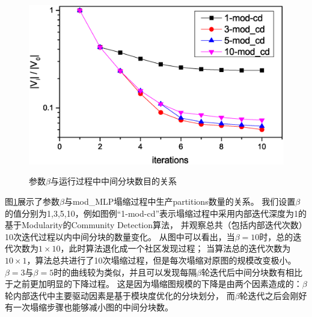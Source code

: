 \documentclass[master]{njuthesis}
\begin{document}
\begin{figure}[h]
  \centering
  \includegraphics[width= 1\textwidth]{figure/conv_time.eps}\\
  \caption{参数$\beta$与运行过程中中间分块数目的关系}
   \label{fig:conv_time}
\end{figure}

图\ref{fig:conv_time}展示了参数$\beta$与mod\string_MLP塌缩过程中生产partitions数量的关系。
我们设置$\beta$的值分别为1,3,5,10，例如图例“1-mod-cd”表示塌缩过程中采用内部迭代深度为1的基于Modularity的Community Detection算法，
并观察总共（包括内部迭代次数）10次迭代过程以内中间分块的数量变化。
从图中可以看出，当$\beta=10$时，总的迭代次数为$1\times 10$，此时算法退化成一个社区发现过程；
当算法总的迭代次数为$10\times 1$，算法总共进行了10次塌缩过程，但是每次塌缩对原图的规模改变极小。
$\beta=3$与$\beta=5$时的曲线较为类似，并且可以发现每隔$\beta$轮迭代后中间分块数有相比于之前更加明显的下降过程。
这是因为塌缩图规模的下降是由两个因素造成的：$\beta$轮内部迭代中主要驱动因素是基于模块度优化的分块划分，
而$\beta$轮迭代之后会刚好有一次塌缩步骤也能够减小图的中间分块数。
\end{document}
